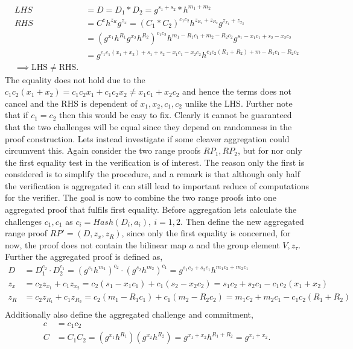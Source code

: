 \begin{align*}
LHS &= D = D_1*D_2 = g^{s_1+s_2}*h^{m_1+m_2} \\
RHS &= C^ch^{z_R}g^{z_x} = (C_1*C_2)^{c_1c_2}h^{z_{R_1}+z_{R_2}}g^{z_{x_1}+z_{x_2}} \\ 
&=(g^{x_1}h^{R_1}g^{x_2}h^{R_2}) ^{c_1c_2}  h^{m_1-R_1c_1+m_2-R_2c_2} g^{s_1- x_1c_1+s_2-x_2c_2} \\
&= g^{c_1c_1(x_1+x_2)+s_1+s_2-x_1c_1-x_2c_2}h^{c_1c_2(R_1+R_2)+m-R_1c_1-R_2c_2} \\
\implies \text{LHS}\neq \text{RHS}.
\end{align*}
The equality does not hold due to the $ c_1c_2(x_1+x_2) = c_1c_2x_1+c_1c_2x_2 \neq x_1c_1 + x_2c_2$ and hence the terms does not cancel and the RHS is dependent of $x_1,x_2,c_1,c_2$ unlike the LHS. Further note that if $c_1=c_2$ then this would be easy to fix. Clearly it cannot be guaranteed that the two challenges will be equal since they depend on randomness in the proof construction. Lets instead investigate if some cleaver aggregation could circumvent this. Again consider the two range proofs $RP_1,RP_2$, but for nor only the first equality test in the verification is of interest. The reason only the first is considered is to simplify the procedure, and a remark is that although only half the verification is aggregated it can still lead to important reduce of computations for the verifier. The goal is now to combine the two range proofs into one aggregated proof  that fulfils first equality. Before aggregation lets  calculate the challenges $c_1,c_1$ as $c_i =Hash(D_i,a_i),\:i=1,2$. Then define the new aggregated range proof  $RP' =(D,z_x,z_R)$, since only the first equality is concerned, for now, the proof does not contain the bilinear map $a$ and the group element $V, z_{\tau}$. Further the aggregated proof is defined as, 
\begin{align*}
D &= D_1^{c_2}\cdot D_2^{c_1} = (g^{s_1}h^{m_1}) ^{c_2} \cdot (g^{s_2}h^{m_2}) ^{c_1}  =g^{s_1c_2+s_2c_1}h^{m_1c_2+m_2c_1} \\
z_x &= c_2z_{x_1} +c_1 z_{x_2} = c_2(s_1-x_1c_1)  + c_1(s_2-x_2c_2) = s_1c_2 + s_2c_1 -c_1c_2(x_1+x_2)\\
z_R &= c_2z_{R_1} +c_1 z_{R_2} = c_2(m_1-R_1c_1)  + c_1(m_2-R_2c_2) = m_1c_2 + m_2c_1 -c_1c_2(R_1+R_2)\\
\end{align*}
Additionally also define the aggregated challenge and commitment,
\begin{align*}
c &= c_1c_2 \\
C &= C_1C_2 = (g^{x_1}h^{R_1}) (g^{x_2}h^{R_2}) = g^{x_1+x_2}h^{R_1+R_2}= g^{x_1+x_2}.
\end{align*}
